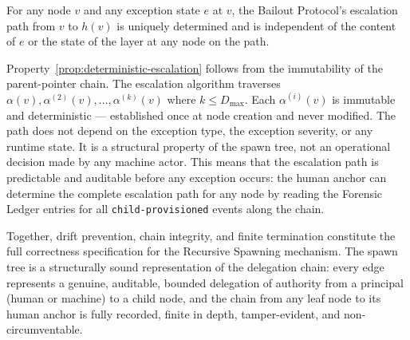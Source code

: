 \begin{property}
\label{prop:deterministic-escalation}
For any node $v$ and any exception state $e$ at $v$, the Bailout Protocol's
escalation path from $v$ to $h(v)$ is uniquely determined and is independent of
the content of $e$ or the state of the \bounds{} layer at any node on the path.
\end{property}

Property~\ref{prop:deterministic-escalation} follows from the immutability of
the parent-pointer chain. The escalation algorithm traverses
$\alpha(v), \alpha^{(2)}(v), \ldots, \alpha^{(k)}(v)$ where $k \leq D_{\max}$.
Each $\alpha^{(i)}(v)$ is immutable and deterministic — established once at node
creation and never modified. The path does not depend on the exception type, the
exception severity, or any runtime state. It is a structural property of the
spawn tree, not an operational decision made by any machine actor. This means
that the escalation path is predictable and auditable before any exception
occurs: the human anchor can determine the complete escalation path for any
node by reading the Forensic Ledger entries for all \texttt{child-provisioned}
events along the chain.

Together, drift prevention, chain integrity, and finite termination constitute
the full correctness specification for the Recursive Spawning mechanism. The
spawn tree is a structurally sound representation of the delegation chain: every
edge represents a genuine, auditable, bounded delegation of authority from a
principal (human or machine) to a child node, and the chain from any leaf node
to its human anchor is fully recorded, finite in depth, tamper-evident, and
non-circumventable.